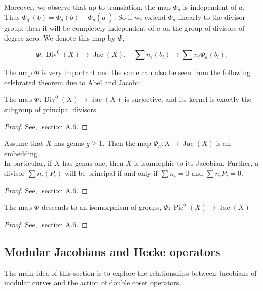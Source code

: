 \begin{remark}
    Moreover, we observe that up to translation, the map $\Phi_{a}$ is independent of $a$. Thus $\Phi_{a^{\prime}}(b)=\Phi_{a}(b)-\Phi_{a}\left(a^{\prime}\right)$. So if we extend $\Phi_{a}$ linearly to the divisor group, then it will be completely independent of $a$ on the group of divisors of degree zero. We denote this map by $\Phi$,

$$
\Phi: \operatorname{Div}^{0}(X) \longrightarrow \operatorname{Jac}(X), \quad \sum n_{i}\left(b_{i}\right) \longmapsto \sum n_{i} \Phi_{a}\left(b_{i}\right) .
$$
\end{remark}




The map $\Phi$ is very important and the same can also be seen from the following celebrated theorem due to Abel and Jacobi:

\begin{theorem}
    The map $\Phi: \operatorname{Div}^{0}(X) \longrightarrow \operatorname{Jac}(X)$ is surjective, and its kernel is exactly the subgroup of principal divisors.

\end{theorem}
\begin{proof}
    See, \cite{hindry-silverman-diophantine},section A.6. 
\end{proof}
\begin{corollary}
    Assume that $X$ has genus $g \geq 1$. Then the map $\Phi_{a}: X \rightarrow \operatorname{Jac}(X)$ is an embedding.\\
In particular, if $X$ has genus one, then $X$ is isomorphic to its Jacobian. Further, a divisor $\sum n_{i}\left(P_{i}\right)$ will be principal if and only if $\sum n_{i}=0$ and $\sum n_{i} P_{i}=0$.
\end{corollary}
\begin{proof}
    See, \cite{hindry-silverman-diophantine},section A.6. 
\end{proof}

\begin{theorem}
    The map $\Phi$ descends to an isomorphism of groups, $\Phi: \operatorname{Pic}^{0}(X) \longrightarrow \operatorname{Jac}(X)$
\end{theorem}
\begin{proof}
    See, \cite{hindry-silverman-diophantine},section A.6. 
\end{proof}

\subsection{Modular Jacobians and Hecke operators}
The main idea of this section is to explore the relationships between Jacobians of modular curves and the action of double coset operators.\\

